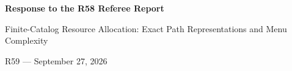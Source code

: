 \documentclass[11pt,letterpaper]{article}
\theoremstyle{definition}\newtheorem{remark}[theorem]{Remark}
\begin{document}
\begin{center}{\Large\bfseries Response to the R58 Referee Report}\par Finite-Catalog Resource Allocation: Exact Path Representations and Menu Complexity\par R59 --- September 27, 2026\end{center}

\end{document}
